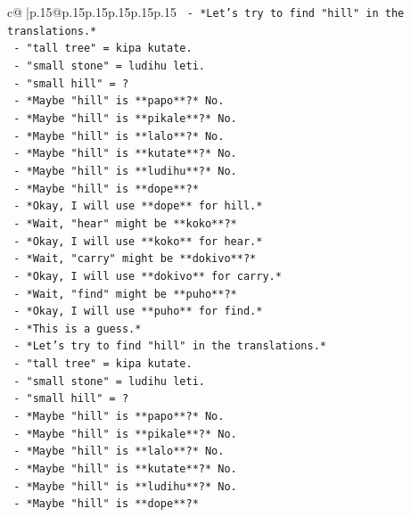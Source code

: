 \documentclass{article}
\begin{document}
{\begin{supertabular}{c@{$\;$}|p{.15\linewidth}@{}p{.15\linewidth}p{.15\linewidth}p{.15\linewidth}p{.15\linewidth}p{.15\linewidth}}
{{{\texttt{       {-} *Let's try to find "hill" in the translations.*} \\
\texttt{       {-} "tall tree" = kipa kutate.} \\
\texttt{       {-} "small stone" = ludihu leti.} \\
\texttt{       {-} "small hill" = ?} \\
\texttt{       {-} *Maybe "hill" is **papo**?* No.} \\
\texttt{       {-} *Maybe "hill" is **pikale**?* No.} \\
\texttt{       {-} *Maybe "hill" is **lalo**?* No.} \\
\texttt{       {-} *Maybe "hill" is **kutate**?* No.} \\
\texttt{       {-} *Maybe "hill" is **ludihu**?* No.} \\
\texttt{       {-} *Maybe "hill" is **dope**?*} \\
\texttt{       {-} *Okay, I will use **dope** for hill.*} \\
\texttt{       {-} *Wait, "hear" might be **koko**?*} \\
\texttt{       {-} *Okay, I will use **koko** for hear.*} \\
\texttt{       {-} *Wait, "carry" might be **dokivo**?*} \\
\texttt{       {-} *Okay, I will use **dokivo** for carry.*} \\
\texttt{       {-} *Wait, "find" might be **puho**?*} \\
\texttt{       {-} *Okay, I will use **puho** for find.*} \\
\texttt{       {-} *This is a guess.*} \\
\texttt{       {-} *Let's try to find "hill" in the translations.*} \\
\texttt{       {-} "tall tree" = kipa kutate.} \\
\texttt{       {-} "small stone" = ludihu leti.} \\
\texttt{       {-} "small hill" = ?} \\
\texttt{       {-} *Maybe "hill" is **papo**?* No.} \\
\texttt{       {-} *Maybe "hill" is **pikale**?* No.} \\
\texttt{       {-} *Maybe "hill" is **lalo**?* No.} \\
\texttt{       {-} *Maybe "hill" is **kutate**?* No.} \\
\texttt{       {-} *Maybe "hill" is **ludihu**?* No.} \\
\texttt{       {-} *Maybe "hill" is **dope**?*} \\
}}}
\end{supertabular}}
\end{document}
